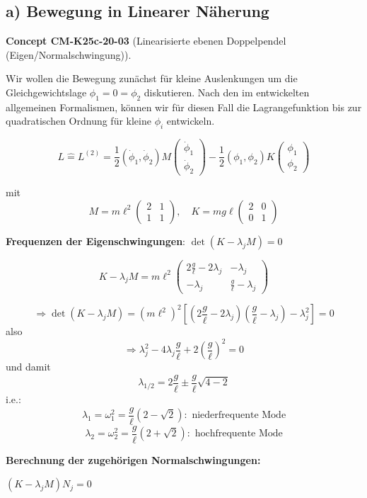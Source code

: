 \documentclass[10pt, letterpaper]{article}
\newcommand{\CustomHeading}[3]{%
  \par\medskip\noindent%
  \textbf{#1 #2} \textnormal{(#3)}.\enskip%
}
\newenvironment{CONC}[2]{\begin{unitbox}\CustomHeading{Concept}{#1}{#2}}{\end{unitbox}}
\begin{document}
\subsection*{a) Bewegung in Linearer Näherung}

\begin{CONC}{CM-K25c-20-03}{Linearisierte ebenen Doppelpendel (Eigen/Normalschwingung)}
Wir wollen die Bewegung zunächst für kleine Auslenkungen um die Gleichgewichtslage $\phi_1=0=\phi_2$ diskutieren. Nach den im entwickelten allgemeinen Formalismen, können wir für diesen Fall die Lagrangefunktion bis zur quadratischen Ordnung für kleine $\phi_i$ entwickeln.

\[L \hat{=} L^{(2)} = \frac{1}{2}(\dot{\phi}_1, \dot{\phi}_2)M\begin{pmatrix}\dot{\phi}_1 \\ \dot{\phi}_2\end{pmatrix} - \frac{1}{2}(\phi_1, \phi_2)K\begin{pmatrix}\phi_1 \\ \phi_2\end{pmatrix}\]

mit \[M = m\ell^2\begin{pmatrix}2 & 1 \\ 1 & 1\end{pmatrix}, \quad K = mg\ell\begin{pmatrix}2 & 0 \\ 0 & 1\end{pmatrix}\]

\textbf{Frequenzen der Eigenschwingungen}: $\det(K-\lambda_j M)=0$

\[K-\lambda_j M = m\ell^2\begin{pmatrix}2\frac{g}{\ell}-2\lambda_j & -\lambda_j \\ -\lambda_j & \frac{g}{\ell}-\lambda_j\end{pmatrix}\]

\[\Rightarrow \det(K-\lambda_j M) = (m\ell^2)^2[(2\frac{g}{\ell}-2\lambda_j)(\frac{g}{\ell}-\lambda_j)-\lambda_j^2] = 0\]
also
\[\Rightarrow \lambda_j^2 - 4\lambda_j\frac{g}{\ell} + 2\left(\frac{g}{\ell}\right)^2 = 0\]
und damit
\[ \lambda_{1/2} = 2\frac{g}{\ell} \pm \frac{g}{\ell}\sqrt{4-2}\]
i.e.:
\[\lambda_1 = \omega_1^2 = \frac{g}{\ell}(2-\sqrt{2}): \text{ niederfrequente Mode}\]
\[\lambda_2 = \omega_2^2 = \frac{g}{\ell}(2+\sqrt{2}): \text{ hochfrequente Mode}\]

\noindent\textbf{Berechnung der zugehörigen Normalschwingungen:}

$(K-\lambda_j M)N_j = 0$


\end{CONC}
\end{document}
